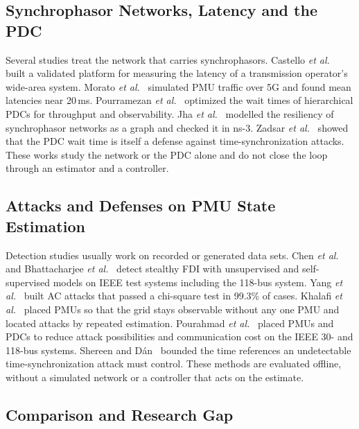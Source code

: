 \documentclass[journal]{IEEEtran}
\begin{document}
\subsection{Synchrophasor Networks, Latency and the PDC}

Several studies treat the network that carries synchrophasors. Castello \emph{et al.}~\cite{castello2024wampac} built a validated platform for measuring the latency of a transmission operator's wide-area system. Morato \emph{et al.}~\cite{morato2024fiveg} simulated PMU traffic over 5G and found mean latencies near 20\,ms. Pourramezan \emph{et al.}~\cite{pourramezan2021pdc} optimized the wait times of hierarchical PDCs for throughput and observability. Jha \emph{et al.}~\cite{jha2023graph} modelled the resiliency of synchrophasor networks as a graph and checked it in ns-3. Zadsar \emph{et al.}~\cite{zadsar2023preventing} showed that the PDC wait time is itself a defense against time-synchronization attacks. These works study the network or the PDC alone and do not close the loop through an estimator and a controller.

\subsection{Attacks and Defenses on PMU State Estimation}

Detection studies usually work on recorded or generated data sets. Chen \emph{et al.}~\cite{chen2022datadriven} and Bhattacharjee \emph{et al.}~\cite{bhattacharjee2023deep} detect stealthy FDI with unsupervised and self-supervised models on IEEE test systems including the 118-bus system. Yang \emph{et al.}~\cite{yang2024tensor} built AC attacks that passed a chi-square test in 99.3\% of cases. Khalafi \emph{et al.}~\cite{khalafi2022intrusion} placed PMUs so that the grid stays observable without any one PMU and located attacks by repeated estimation. Pourahmad \emph{et al.}~\cite{pourahmad2023pmupdc} placed PMUs and PDCs to reduce attack possibilities and communication cost on the IEEE 30- and 118-bus systems. Shereen and D\'an~\cite{shereen2024topology} bounded the time references an undetectable time-synchronization attack must control. These methods are evaluated offline, without a simulated network or a controller that acts on the estimate.

\subsection{Comparison and Research Gap}
\end{document}
